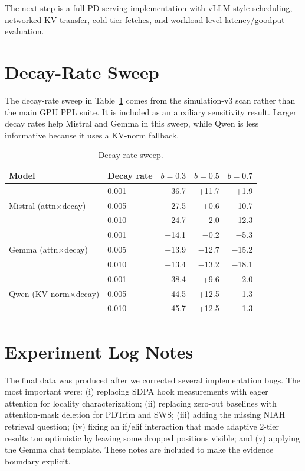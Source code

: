 \documentclass[11pt]{article}
\newcommand{\niah}{NIAH}
\newcommand{\budget}{b}
\theoremstyle{plain}
\theoremstyle{definition}
\begin{document}
The next step is a full PD serving implementation with vLLM-style scheduling, networked KV transfer, cold-tier fetches, and workload-level latency/goodput evaluation.

\appendix

\section{Decay-Rate Sweep}
\label{app:decay}

The decay-rate sweep in Table~\ref{tab:decay} comes from the simulation-v3 scan rather than the main GPU PPL suite.  It is included as an auxiliary sensitivity result.  Larger decay rates help Mistral and Gemma in this sweep, while Qwen is less informative because it uses a KV-norm fallback.

\begin{table}[h]
\centering
\caption{Decay-rate sweep.}
\label{tab:decay}
\small
\begin{tabular}{llrrr}
\toprule
Model & Decay rate & $\budget=0.3$ & $\budget=0.5$ & $\budget=0.7$ \\
\midrule
\multirow{3}{*}{Mistral (attn$\times$decay)} & 0.001 & +36.7 & +11.7 & +1.9 \\
 & 0.005 & +27.5 & +0.6 & $-$10.7 \\
 & 0.010 & +24.7 & $-$2.0 & $-$12.3 \\
\midrule
\multirow{3}{*}{Gemma (attn$\times$decay)} & 0.001 & +14.1 & $-$0.2 & $-$5.3 \\
 & 0.005 & +13.9 & $-$12.7 & $-$15.2 \\
 & 0.010 & +13.4 & $-$13.2 & $-$18.1 \\
\midrule
\multirow{3}{*}{Qwen (KV-norm$\times$decay)} & 0.001 & +38.4 & +9.6 & $-$2.0 \\
 & 0.005 & +44.5 & +12.5 & $-$1.3 \\
 & 0.010 & +45.7 & +12.5 & $-$1.3 \\
\bottomrule
\end{tabular}
\end{table}

\section{Experiment Log Notes}
\label{app:notes}

The final data was produced after we corrected several implementation bugs.  The most important were: (i) replacing SDPA hook measurements with eager attention for locality characterization; (ii) replacing zero-out baselines with attention-mask deletion for PDTrim and SWS; (iii) adding the missing \niah{} retrieval question; (iv) fixing an if/elif interaction that made adaptive 2-tier results too optimistic by leaving some dropped positions visible; and (v) applying the Gemma chat template.  These notes are included to make the evidence boundary explicit.



\end{document}
